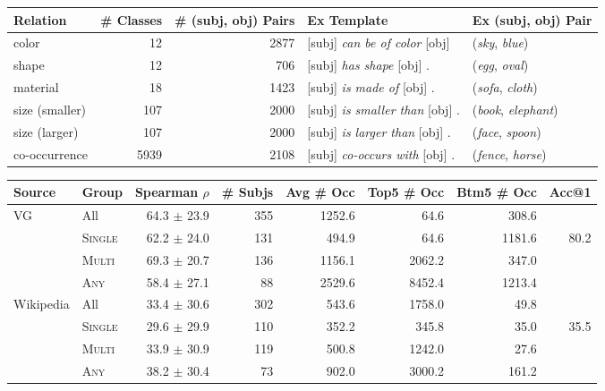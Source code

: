 \documentclass[11pt]{article}
\newcommand{\Single}{{\scshape Single}}
\newcommand{\Multi}{{\scshape Multi}}
\newcommand{\Any}{{\scshape Any}}
\newcommand{\dataset}{ViComTe}
\begin{document}
\begin{table*}
\small
\centering
\begin{tabular}{lrrll}
\hline
\textbf{Relation} & \textbf{\# Classes} & \textbf{\# (subj, obj) Pairs} & \textbf{Ex Template} & \textbf{Ex (subj, obj) Pair} \\
\hline
color & 12 & 2877 & [subj] {\it can be of color} [obj] & ({\it sky}, {\it blue}) \\
shape & 12 & 706 & [subj] {\it has shape} [obj] . & ({\it egg}, {\it oval}) \\
material & 18 & 1423 & [subj] {\it is made of} [obj] . & ({\it sofa}, {\it cloth}) \\
size (smaller) & 107 & 2000 & [subj] {\it is smaller than} [obj] . & ({\it book}, {\it elephant}) \\
size (larger) & 107 & 2000 & [subj] {\it is larger than} [obj] . & ({\it face}, {\it spoon}) \\
co-occurrence & 5939 & 2108 & [subj] {\it co-occurs with} [obj] . & ({\it fence}, {\it horse}) \\
\hline
\end{tabular}
\caption{\label{data-summary}
Summary of the {\dataset} dataset and the manual templates, including the number of classes, (subject, object) pairs, and an example pair for each relation.}

\hspace{1.4cm}

\begin{tabular}{llrrrrrr}
\hline 
\textbf{Source} & \textbf{Group} & \textbf{Spearman $\rho$} & \textbf{\# Subjs} & \textbf{Avg \# Occ} & \textbf{Top5 \# Occ} & \textbf{Btm5 \# Occ} & \textbf{Acc@1} \\ 
\hline
VG & All & 64.3 $\pm$ 23.9 & 355 & 1252.6 & 64.6 & 308.6\\
 & \Single{} & 62.2 $\pm$ 24.0 & 131 & 494.9 & 64.6 & 1181.6 & 80.2\\
 & \Multi{} & 69.3 $\pm$ 20.7 & 136 & 1156.1 & 2062.2 & 347.0\\
 & \Any{} & 58.4 $\pm$ 27.1 & 88 & 2529.6 & 8452.4 & 1213.4\\
\hline
Wikipedia & All & 33.4 $\pm$ 30.6 & 302 & 543.6 & 1758.0 & 49.8\\
 & \Single{} & 29.6 $\pm$ 29.9 & 110 & 352.2 & 345.8 & 35.0 & 35.5\\
 & \Multi{} & 33.9 $\pm$ 30.9 & 119 & 500.8 & 1242.0 & 27.6\\
 & \Any{} & 38.2 $\pm$ 30.4 & 73 & 902.0 & 3000.2 & 161.2\\
\hline
\end{tabular}
\caption{\label{data-eval} Evaluation of {\dataset} (mined from VG) and Wikipedia-mined color datasets by comparing with the human-annotated dataset CoDa. Reported are the average Spearman correlation ($\times 100$), number of common subjects, average number of occurrences of the common subjects, average number of occurrences of subjects with top- and bottom-5 Spearman correlations, and the percentage of top-1 attributes being matched for the single group. {\dataset} has higher correlations with human annotations.}
\end{table*}
\end{document}
